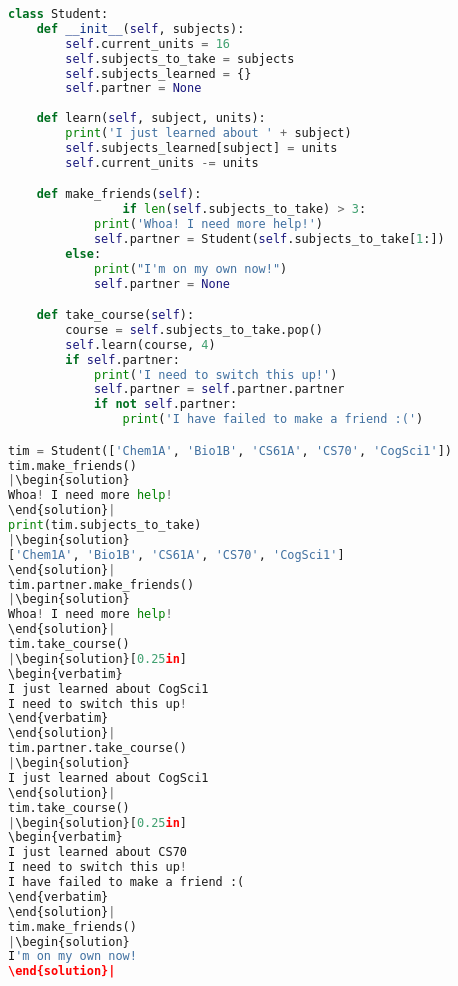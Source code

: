 \begin{lstlisting}[language=Python]
class Student: 
	def __init__(self, subjects):
		self.current_units = 16
		self.subjects_to_take = subjects
		self.subjects_learned = {}
		self.partner = None
	
	def learn(self, subject, units):
		print('I just learned about ' + subject)
		self.subjects_learned[subject] = units
		self.current_units -= units

	def make_friends(self):
                if len(self.subjects_to_take) > 3:
			print('Whoa! I need more help!')
			self.partner = Student(self.subjects_to_take[1:])
		else:
			print("I'm on my own now!")
			self.partner = None

	def take_course(self):
		course = self.subjects_to_take.pop()
		self.learn(course, 4)
		if self.partner:
			print('I need to switch this up!')
			self.partner = self.partner.partner
			if not self.partner:
				print('I have failed to make a friend :(')

tim = Student(['Chem1A', 'Bio1B', 'CS61A', 'CS70', 'CogSci1'])
tim.make_friends()
|\begin{solution}
Whoa! I need more help!
\end{solution}|
print(tim.subjects_to_take)
|\begin{solution}
['Chem1A', 'Bio1B', 'CS61A', 'CS70', 'CogSci1']
\end{solution}|
tim.partner.make_friends()
|\begin{solution}
Whoa! I need more help!
\end{solution}|
tim.take_course()
|\begin{solution}[0.25in]
\begin{verbatim}
I just learned about CogSci1
I need to switch this up!  
\end{verbatim}
\end{solution}|
tim.partner.take_course()
|\begin{solution}
I just learned about CogSci1
\end{solution}|
tim.take_course()
|\begin{solution}[0.25in]
\begin{verbatim}
I just learned about CS70
I need to switch this up!
I have failed to make a friend :(  
\end{verbatim}
\end{solution}|
tim.make_friends()
|\begin{solution}
I'm on my own now!
\end{solution}|
\end{lstlisting}

